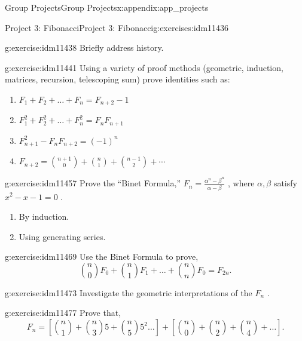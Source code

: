 \documentclass[oneside,10pt,]{book}
\numberwithin{equation}{chapter}
\begin{document}
\begin{appendixptx}{Group Projects}{}{Group Projects}{}{}{x:appendix:app_projects}
%
\begin{exercises-section-numberless}{Project 3: Fibonacci}{}{Project 3: Fibonacci}{}{}{g:exercises:idm11436}
\begin{divisionexercise}{1}{}{}{g:exercise:idm11438}%
Briefly address history.%
\end{divisionexercise}%
\begin{divisionexercise}{2}{}{}{g:exercise:idm11441}%
Using a variety of proof methods (geometric, induction, matrices, recursion, telescoping sum) prove identities such as:%
\begin{enumerate}[label=(\alph*)]
\item{}\(F_{1} + F_{2} + \ldots + F_{n} = F_{n + 2} - 1\)%
\item{}\(F_{1}^{2} + F_{2}^{2} + \ldots + F_{n}^{2} = F_{n}F_{n + 1}\)%
\item{}\(F_{n + 1}^{2} - F_{n}F_{n + 2} = \left( - 1 \right)^{n}\)%
\item{}\(F_{n + 2} = \binom{n + 1}{0} + \binom{n}{1} + \binom{n - 1}{2} + \cdots\)%
\end{enumerate}
%
\end{divisionexercise}%
\begin{divisionexercise}{3}{}{}{g:exercise:idm11457}%
Prove the ``Binet Formula,'' \(F_{n} = \frac{\alpha^{n} - \beta^{n}}{\alpha - \beta}\) , where \(\alpha,\beta\) satisfy \(x^{2} - x - 1 = 0\) .%
\begin{enumerate}[label=(\alph*)]
\item{}By induction.%
\item{}Using generating series.%
\end{enumerate}
%
\end{divisionexercise}%
\begin{divisionexercise}{4}{}{}{g:exercise:idm11469}%
Use the Binet Formula to prove,%
\begin{equation*}
\binom{n}{0}F_{0} + \binom{n}{1} F_{1} + \ldots + \binom{n}{n}F_{0} = F_{2n}.
\end{equation*}
%
\end{divisionexercise}%
\begin{divisionexercise}{5}{}{}{g:exercise:idm11473}%
Investigate the geometric interpretations of the \(F_{n}\) .%
\end{divisionexercise}%
\begin{divisionexercise}{6}{}{}{g:exercise:idm11477}%
Prove that,%
\begin{equation*}
F_{n} = \left\lbrack \binom{n}{1}  + \binom{n}{3} 5 + \binom{n}{5} 5^{2}\ldots \right\rbrack + \left\lbrack \binom{n}{0}  + \binom{n}{2}  + \binom{n}{4}  + \ldots \right\rbrack.

\end{equation*}
\end{divisionexercise}
\end{exercises-section-numberless}
\end{appendixptx}
\end{document}
